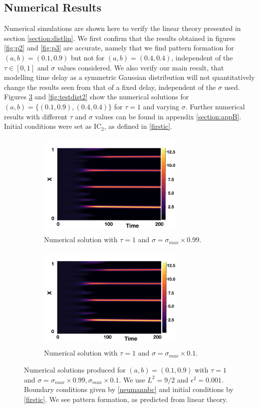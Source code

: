 \subsection{Numerical Results}\label{section:distsim}
Numerical simulations are shown here to verify the linear theory presented in section \ref{section:distlin}. We first confirm that the results obtained in figures \ref{fig:p2} and \ref{fig:p3} are accurate, namely that we find pattern formation for $(a,b)=(0.1,0.9)$ but not for $(a,b)=(0.4,0.4)$, independent of the $\tau\in[0,1]$ and $\sigma$ values considered. We also verify our main result, that modelling time delay as a symmetric Gaussian distribution will not quantitatively change the results seen from that of a fixed delay, independent of the $\sigma$ used. Figures \ref{fig:testdist1} and \ref{fig:testdist2} show the numerical solutions for $(a,b)=\{(0.1,0.9),(0.4,0.4)\}$ for $\tau=1$ and varying $\sigma$. Further numerical results with different $\tau$ and $\sigma$ values can be found in appendix \ref{section:appB}. Initial conditions were set as $\text{IC}_2$, as defined in \eqref{firstic}.

\begin{figure}[H]
    \centering
    \begin{subfigure}[t]{0.45\textwidth}
        \centering
        \includegraphics[width=7cm,height=5cm]{distp1sig1.png}
        \caption{Numerical solution with $\tau=1$ and $\sigma=\sigma_{max}\times0.99$.}
        \label{}
    \end{subfigure}
    \hfill
    \begin{subfigure}[t]{0.45\textwidth}
        \centering
        \includegraphics[width=7cm,height=5cm]{distp1sig2.png}
        \caption{Numerical solution with $\tau=1$ and $\sigma=\sigma_{max}\times0.1$.}
        \label{}
    \end{subfigure}
    \caption{Numerical solutions produced for $(a,b)=(0.1,0.9)$ with $\tau=1$ and $\sigma=\sigma_{max}\times0.99, \sigma_{max}\times0.1$. We use $L^2=9/2$ and $\epsilon^2=0.001$.
    Boundary conditions given by \eqref{neumannbc} and initial conditions by \eqref{firstic}. We see pattern formation, as predicted from linear theory.}
    \label{fig:testdist1}
\end{figure}

